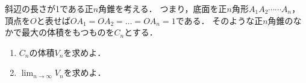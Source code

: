 \documentclass[../../main.tex]{subfiles}
\begin{document}
斜辺の長さが1である正$n$角錐を考える．
つまり，底面を正$n$角形$A_1 A_2 \cdots\cdots A_n$，頂点を$O$と表せば$OA_1=OA_2=\dots=OA_n=1$である．
そのような正$n$角錐のなかで最大の体積をもつものを$C_n$とする．
\begin{enumerate}
  \item $C_n$の体積$V_n$を求めよ．
  \item $\displaystyle \lim_{n \to \infty}V_n$を求めよ．
\end{enumerate}
\end{document}
